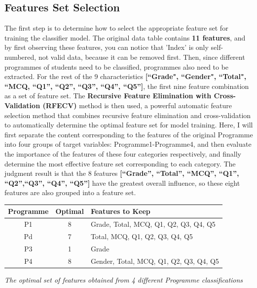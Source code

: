 \documentclass[twocolumn]{IEEEtran}
\begin{document}
\subsection{Features Set Selection}
The first step is to determine how to select the appropriate feature set for training the classifier model. The original data table contains \textbf{11 features}, and by first observing these features, you can notice that 'Index' is only self-numbered, not valid data, because it can be removed first. Then, since different programmes of students need to be classified, programmes also need to be extracted. For the rest of the 9 characteristics \textbf{[``Grade", ``Gender", ``Total", ``MCQ, ``Q1'', ``Q2'', ``Q3'', ``Q4'', ``Q5'']}, the first nine feature combination as a set of feature set. The \textbf{Recursive Feature Elimination with Cross-Validation (RFECV)} method is then used, a powerful automatic feature selection method that combines recursive feature elimination and cross-validation to automatically determine the optimal feature set for model training. Here, I will first separate the content corresponding to the features of the original Programme into four groups of target variables: Programme1-Programme4, and then evaluate the importance of the features of these four categories respectively, and finally determine the most effective feature set corresponding to each category. The judgment result is that the 8 features \textbf{[``Grade'', ``Total'', ``MCQ'', ``Q1'', ``Q2'',``Q3'', ``Q4'', ``Q5'']} have the greatest overall influence, so these eight features are also grouped into a feature set.
\begin{table}[H]
    \centering
    {\small %
    \begin{tabular}{|c|c|p{3.5cm}|} %
    \hline
    \textbf{Programme} & \textbf{Optimal} & \textbf{Features to Keep} \\
        \hline
        P1 & 8 & Grade, Total, MCQ, Q1, Q2, Q3, Q4, Q5 \\
        \hline
        Pd & 7 & Total, MCQ, Q1, Q2, Q3, Q4, Q5 \\
        \hline
        P3 & 1 & Grade \\
        \hline
        P4 & 8 & Gender, Total, MCQ, Q1, Q2, Q3, Q4, Q5 \\
        \hline
    \end{tabular}
    } %
\end{table}

\textit{The optimal set of features obtained from 4 different Programme classifications}
\end{document}
